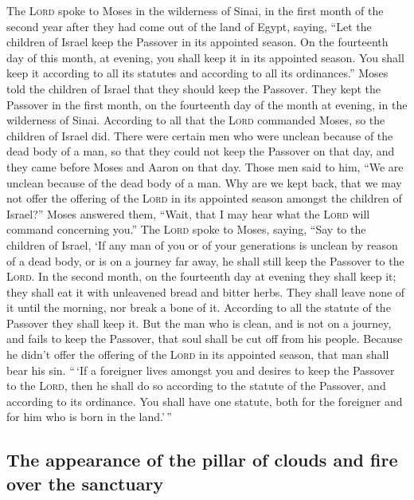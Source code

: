  The \textsc{Lord} spoke to Moses in the wilderness of
Sinai, in the first month of the second year after they had come out of
the land of Egypt, saying,  ``Let the children of Israel
keep the Passover in its appointed season.  On the
fourteenth day of this month, at evening, you shall keep it in its
appointed season. You shall keep it according to all its statutes and
according to all its ordinances.''  Moses told the
children of Israel that they should keep the Passover. 
They kept the Passover in the first month, on the fourteenth day of the
month at evening, in the wilderness of Sinai. According to all that the
\textsc{Lord} commanded Moses, so the children of Israel did.
 There were certain men who were unclean because of the
dead body of a man, so that they could not keep the Passover on that
day, and they came before Moses and Aaron on that day. 
Those men said to him, ``We are unclean because of the dead body of a
man. Why are we kept back, that we may not offer the offering of the
\textsc{Lord} in its appointed season amongst the children of Israel?''
 Moses answered them, ``Wait, that I may hear what the
\textsc{Lord} will command concerning you.''  The
\textsc{Lord} spoke to Moses, saying,  ``Say to the
children of Israel, `If any man of you or of your generations is unclean
by reason of a dead body, or is on a journey far away, he shall still
keep the Passover to the \textsc{Lord}.  In the second
month, on the fourteenth day at evening they shall keep it; they shall
eat it with unleavened bread and bitter herbs.  They
shall leave none of it until the morning, nor break a bone of it.
According to all the statute of the Passover they shall keep it.
 But the man who is clean, and is not on a journey, and
fails to keep the Passover, that soul shall be cut off from his people.
Because he didn't offer the offering of the \textsc{Lord} in its
appointed season, that man shall bear his sin.  ``\,`If a
foreigner lives amongst you and desires to keep the Passover to the
\textsc{Lord}, then he shall do so according to the statute of the
Passover, and according to its ordinance. You shall have one statute,
both for the foreigner and for him who is born in the land.'\,''

\hypertarget{the-appearance-of-the-pillar-of-clouds-and-fire-over-the-sanctuary}{%
\subsection{The appearance of the pillar of clouds and fire over the
sanctuary}\label{the-appearance-of-the-pillar-of-clouds-and-fire-over-the-sanctuary}}

